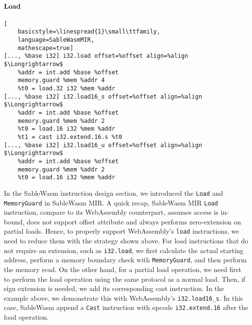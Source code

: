 \paragraph{Load} \quad
\begin{lstlisting}[
    basicstyle=\linespread{1}\small\ttfamily, 
    language=SableWasmMIR, 
    mathescape=true]
[..., %base i32] i32.load offset=%offset align=%align $\Longrightarrow$
    %addr = int.add %base %offset
    memory.guard %mem %addr 4
    %t0 = load.32 i32 %mem %addr
[..., %base i32] i32.load16_s offset=%offset align=%align $\Longrightarrow$
    %addr = int.add %base %offset
    memory.guard %mem %addr 2
    %t0 = load.16 i32 %mem %addr
    %t1 = cast i32.extend.16.s %t0
[..., %base i32] i32.load16_u offset=%offset align=%align $\Longrightarrow$
    %addr = int.add %base %offset
    memory.guard %mem %addr 2
    %t0 = load.16 i32 %mem %addr
\end{lstlisting}
In the SableWasm instruction design section, we introduced the \texttt{Load} and
\texttt{MemoryGuard} in SableWasm MIR. A quick recap, SableWasm MIR
\texttt{Load} instruction, compare to its WebAssembly counterpart, assumes
access is in-bound, does not support offset attribute and always performs
zero-extension on partial loads. Hence, to properly support WebAssembly's
\texttt{load} instructions, we need to reduce them with the strategy shown
above. For load instructions that do not require an extension, such as
\texttt{i32.load}, we first calculate the actual starting address, perform a
memory boundary check with \texttt{MemoryGuard}, and then perform the memory
read. On the other hand, for a partial load operation, we need first to perform
the load operation using the same protocol as a normal load. Then, if sign
extension is needed, we add its corresponding cast instruction. In the example
above, we demonstrate this with WebAssembly's \texttt{i32.load16\_s}. In this
case, SableWasm append a \texttt{Cast} instruction with opcode
\texttt{i32.extend.16} after the load operation.

